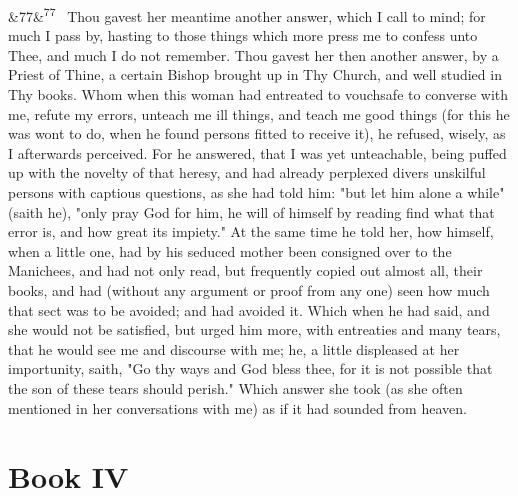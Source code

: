 \documentclass[12pt]{article}
\newcommand{\para}[1][]{\par\noindent\ifx&#1&\else\textsuperscript{\footnotesize #1}~\fi}
\begin{document}
\para[77] Thou gavest her meantime another answer, which I call to mind; for much I pass by, hasting to those things which more press me to confess unto Thee, and much I do not remember. Thou gavest her then another answer, by a Priest of Thine, a certain Bishop brought up in Thy Church, and well studied in Thy books. Whom when this woman had entreated to vouchsafe to converse with me, refute my errors, unteach me ill things, and teach me good things (for this he was wont to do, when he found persons fitted to receive it), he refused, wisely, as I afterwards perceived. For he answered, that I was yet unteachable, being puffed up with the novelty of that heresy, and had already perplexed divers unskilful persons with captious questions, as she had told him: "but let him alone a while" (saith he), "only pray God for him, he will of himself by reading find what that error is, and how great its impiety." At the same time he told her, how himself, when a little one, had by his seduced mother been consigned over to the Manichees, and had not only read, but frequently copied out almost all, their books, and had (without any argument or proof from any one) seen how much that sect was to be avoided; and had avoided it. Which when he had said, and she would not be satisfied, but urged him more, with entreaties and many tears, that he would see me and discourse with me; he, a little displeased at her importunity, saith, "Go thy ways and God bless thee, for it is not possible that the son of these tears should perish." Which answer she took (as she often mentioned in her conversations with me) as if it had sounded from heaven.

\section*{Book IV}
\end{document}
